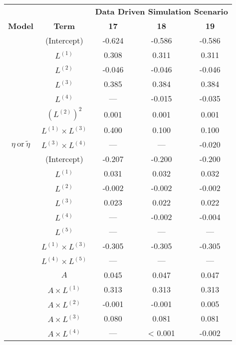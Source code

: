 \begin{table}
\begin{minipage}[t]{0.5\textwidth}
\centering

\begin{tabular}[t]{|>{}c|c|c|c|>{}c|}
\hline
\multicolumn{1}{|c|}{\textbf{ }} & \multicolumn{1}{|c|}{\textbf{ }} & \multicolumn{3}{|c|}{\textbf{Data Driven Simulation Scenario}} \\
\cline{3-5}
\textbf{Model} & \textbf{Term} & \textbf{17} & \textbf{18} & \textbf{19}\\
\hline
 & (Intercept) & -0.624 & -0.586 & -0.586\\
\cline{2-5}
 & $L^{(1)}$ & 0.308 & 0.311 & 0.311\\
\cline{2-5}
 & $L^{(2)}$ & -0.046 & -0.046 & -0.046\\
\cline{2-5}
 & $L^{(3)}$ & 0.385 & 0.384 & 0.384\\
\cline{2-5}
 & $L^{(4)}$ & --- & -0.015 & -0.035\\
\cline{2-5}
 & $(L^{(2)})^2$ & 0.001 & 0.001 & 0.001\\
\cline{2-5}
 & $L^{(1)} \times L^{(3)}$ & 0.400 & 0.100 & 0.100\\
\cline{2-5}
\multirow{-8}{*}{\centering\arraybackslash $\eta~\text{or}~\tilde\eta$} & $L^{(3)} \times L^{(4)}$ & --- & --- & -0.020\\
\cline{1-5}
 & (Intercept) & -0.207 & -0.200 & -0.200\\
\cline{2-5}
 & $L^{(1)}$ & 0.031 & 0.032 & 0.032\\
\cline{2-5}
 & $L^{(2)}$ & -0.002 & -0.002 & -0.002\\
\cline{2-5}
 & $L^{(3)}$ & 0.023 & 0.022 & 0.022\\
\cline{2-5}
 & $L^{(4)}$ & --- & -0.002 & -0.004\\
\cline{2-5}
 & $L^{(5)}$ & --- & --- & ---\\
\cline{2-5}
 & $L^{(1)} \times L^{(3)}$ & -0.305 & -0.305 & -0.305\\
\cline{2-5}
 & $L^{(4)} \times L^{(5)}$ & --- & --- & ---\\
\cline{2-5}
 & $A$ & 0.045 & 0.047 & 0.047\\
\cline{2-5}
 & $A \times L^{(1)}$ & 0.313 & 0.313 & 0.313\\
\cline{2-5}
 & $A \times L^{(2)}$ & -0.001 & -0.001 & 0.005\\
\cline{2-5}
 & $A \times L^{(3)}$ & 0.080 & 0.081 & 0.081\\
\cline{2-5}
 & $A \times L^{(4)}$ & --- & < 0.001 & -0.002\\

\end{tabular}
\end{minipage}
\end{table}
